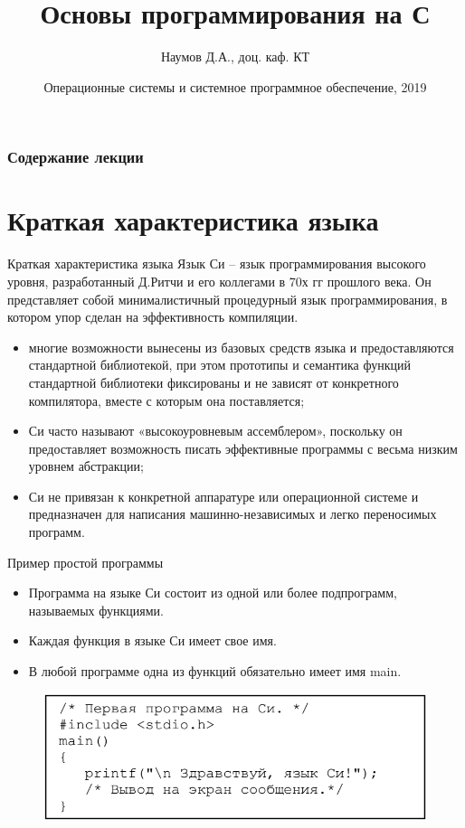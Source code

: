 \documentclass{beamer}
\title[Язык C]{Основы программирования на С}
\author{Наумов Д.А., доц. каф. КТ}
\date[11.02.2019] {Операционные системы и системное программное обеспечение, 2019}
\begin{document}
\begin{frame}
  \titlepage
\end{frame}
  
\begin{frame}
  \frametitle{Содержание лекции}
  \tableofcontents  
\end{frame}

\section{Краткая характеристика языка}

\begin{frame}{Краткая характеристика языка}
Язык Си – язык программирования высокого уровня, разработанный Д.Ритчи и его коллегами в 70х гг прошлого века. Он представляет собой минималистичный процедурный язык программирования, в котором упор сделан на эффективность компиляции.
\begin{itemize}
\item многие возможности вынесены из базовых средств языка и предоставляются стандартной библиотекой, при этом прототипы и семантика функций стандартной библиотеки фиксированы и не зависят от конкретного компилятора, вместе с которым она поставляется;
\item Си часто называют «высокоуровневым ассемблером», поскольку он предоставляет возможность писать эффективные программы с весьма низким уровнем абстракции;
\item Си не привязан к конкретной аппаратуре или операционной системе и предназначен для написания машинно-независимых и легко переносимых программ.
\end{itemize}
\end{frame} 

\begin{frame}{Пример простой программы}
\begin{itemize}
\item Программа на языке Си состоит из одной или более подпрограмм,
называемых функциями. 
\item Каждая функция в языке Си имеет свое имя. 
\item В любой программе одна из функций обязательно имеет имя main.
\end{itemize}
\begin{figure}[h]
\centering
\includegraphics[scale=0.6]{images/lec02-pic00.png}
\end{figure}
\end{frame}
\end{document}
